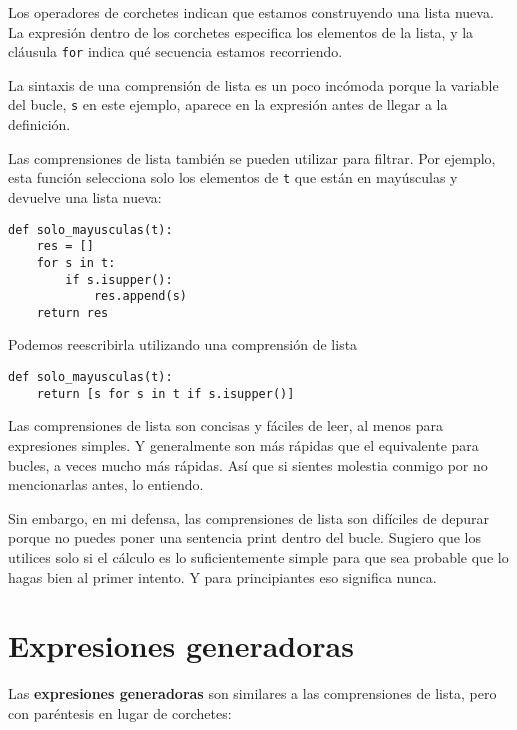 \documentclass[10pt]{book}
\begin{document}
Los operadores de corchetes indican que estamos construyendo una lista
nueva.  La expresión dentro de los corchetes especifica los elementos
de la lista, y la cláusula {\tt for} indica qué secuencia
estamos recorriendo.

La sintaxis de una comprensión de lista es un poco incómoda porque
la variable del bucle, {\tt s} en este ejemplo, aparece en la expresión
antes de llegar a la definición.

Las comprensiones de lista también se pueden utilizar para filtrar.  Por ejemplo,
esta función selecciona solo los elementos de {\tt t} que están
en mayúsculas y devuelve una lista nueva:


\begin{verbatim}
def solo_mayusculas(t):
    res = []
    for s in t:
        if s.isupper():
            res.append(s)
    return res
\end{verbatim}

Podemos reescribirla utilizando una comprensión de lista

\begin{verbatim}
def solo_mayusculas(t):
    return [s for s in t if s.isupper()]
\end{verbatim}

Las comprensiones de lista son concisas y fáciles de leer, al menos para expresiones
simples.  Y generalmente son más rápidas que el equivalente para
bucles, a veces mucho más rápidas.  Así que si sientes molestia conmigo por no
mencionarlas antes, lo entiendo.

Sin embargo, en mi defensa, las comprensiones de lista son difíciles de depurar porque
no puedes poner una sentencia print dentro del bucle.  Sugiero que los
utilices solo si el cálculo es lo suficientemente simple para que sea probable
que lo hagas bien al primer intento.  Y para principiantes eso significa nunca.



\section{Expresiones generadoras}

Las {\bf expresiones generadoras} son similares a las comprensiones de lista, pero
con paréntesis en lugar de corchetes:
\end{document}
